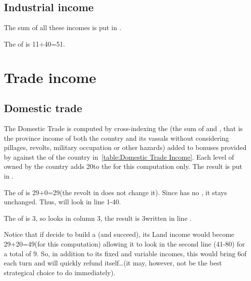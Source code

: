 \subsection{Industrial income}
\aparag The sum of all these incomes is put in .

\begin{exemple}
  The  of \POR is 11+40=51\ducats.
\end{exemple}

\section{Trade income}\label{chIncomes:Trade Income}
\subsection{Domestic trade}
\aparag The Domestic Trade is computed by cross-indexing the
 (the sum of  and , that is the
province income of both the country and its vassals without considering
pillages, revolts, military occupation or other hazards)
added to bonuses provided by \MNU against the \DTI of the country
in~\ref{table:Domestic Trade Income}.
\bparag Each level of  \MNU owned by the country adds
20\ducats to the  for this computation
only.
\bparag The result is put in .


\begin{exemple}
  The  of \POR is 29+0=29\ducats (the
  revolt in \provinceBeira does not change it). Since \POR has no
   \MNU, it stays unchanged. Thus, \POR will look in line
  1-40.

  The \DTI of \POR is 3, so \POR looks in column 3, the result is
  3\ducats written in line .

  Notice that if \POR decide to build a  \MNU (and
  succeed), its Land income would become 29+20=49\ducats (for this
  computation) allowing it to look in the second line (41-80) for a
  total of 9\ducats. So, in addition to its fixed and variable incomes,
  this \MNU would bring 6\ducats of  each
  turn and will quickly refund itself\ldots (it may, however, not be the
  best strategical choice to do immediately).
\end{exemple}

